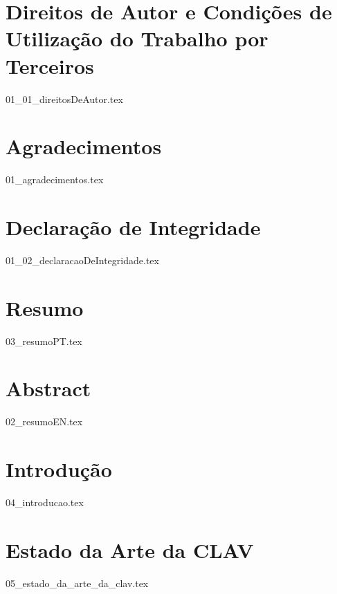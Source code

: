 \documentclass[
  oneside,
  12pt, a4paper,
  footinclude=true,
  headinclude=true,
  cleardoublepage=empty
]{scrbook}
\author{José Carlos Lima Martins}
\date{\myear} %
\begin{document}
    \umfrontcover{}
    \umtitlepage{}
	
    \chapter*{Direitos de Autor e Condições de Utilização do Trabalho por Terceiros}
    {01_01_direitosDeAutor.tex}

	\chapter*{Agradecimentos}
    {01_agradecimentos.tex}

    \chapter*{Declaração de Integridade}
    {01_02_declaracaoDeIntegridade.tex}

	\chapter*{Resumo}
    {03_resumoPT.tex}

    \cleardoublepage{}

	\chapter*{Abstract}
    {02_resumoEN.tex}
	
	\tableofcontents
	\listoffigures
	\listoftables
	\lstlistoflistings
    \printglossary[type=\acronymtype, title={Lista de Acrónimos}, style=treenoname]
	
    \cleardoublepage{}
	
    \chapter{Introdução}
    {04_introducao.tex}

	\chapter{Estado da Arte da CLAV}
    {05_estado_da_arte_da_clav.tex}
\end{document}
